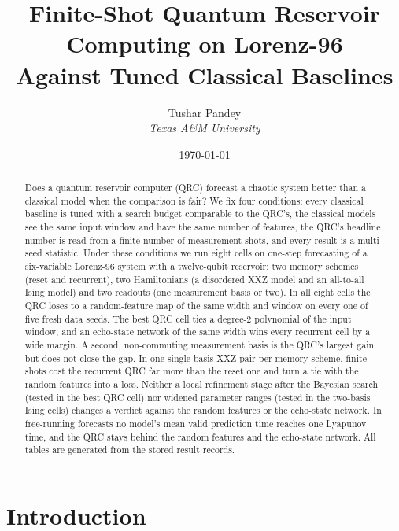 \documentclass[11pt,a4paper]{article}
\title{Finite-Shot Quantum Reservoir Computing on Lorenz-96\\
Against Tuned Classical Baselines}
\author{
    Tushar Pandey\\
    \textit{Texas A\&M University}
}
\date{\today}
\begin{document}
\maketitle

\begin{abstract}
Does a quantum reservoir computer (QRC) forecast a chaotic system better than a classical model
when the comparison is fair? We fix four conditions: every classical baseline is tuned with a
search budget comparable to the QRC's, the classical models see the same input window and have the
same number of features, the QRC's headline number is read from a finite number of measurement
shots, and every result is a multi-seed statistic. Under these conditions we run eight cells on
one-step forecasting of a six-variable Lorenz-96 system with a twelve-qubit reservoir: two memory
schemes (reset and recurrent), two Hamiltonians (a disordered XXZ model and an all-to-all Ising
model) and two readouts (one measurement basis or two). In all eight cells the QRC loses to a
random-feature map of the same width and window on every one of five fresh data seeds. The best QRC
cell ties a degree-2 polynomial of the input window, and an echo-state network of the same width
wins every recurrent cell by a wide margin. A second, non-commuting measurement basis is the QRC's
largest gain but does not close the gap. In one single-basis XXZ pair per memory scheme, finite
shots cost the recurrent QRC far more than the reset one and turn a tie with the random features
into a loss. Neither a local refinement stage after the Bayesian search (tested in the best QRC
cell) nor widened parameter ranges (tested in the two-basis Ising cells) changes a verdict against
the random features or the echo-state network. In free-running forecasts no model's mean valid
prediction time reaches one Lyapunov time, and the QRC stays behind the random features and the
echo-state network. All tables are generated from the stored result records.
\end{abstract}

\section{Introduction}
\end{document}
